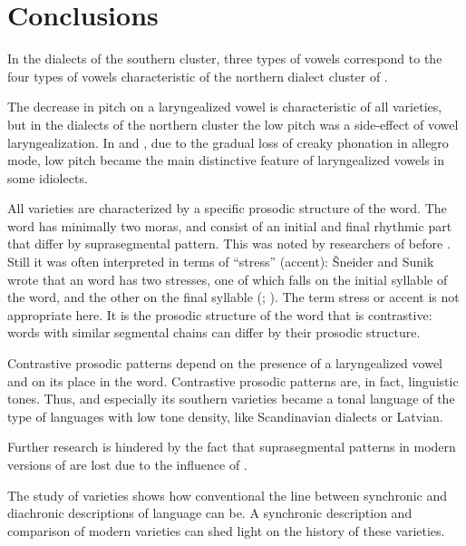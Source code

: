 \documentclass[output=paper,colorlinks,citecolor=brown]{langscibook}
\begin{document}
\section{Conclusions}

In the dialects of the southern cluster, three types of vowels correspond to the four types of vowels characteristic of the northern dialect cluster of .

The decrease in pitch on a laryngealized vowel is characteristic of all  varieties, but in the dialects of the northern cluster the low pitch was a side-effect of vowel laryngealization. In  and , due to the gradual loss of creaky phonation in allegro mode, low pitch became the main distinctive feature of laryngealized vowels in some idiolects.

\begin{sloppypar}
All  varieties are characterized by a specific prosodic structure of the word. The word has minimally two moras, and consist of an initial and final rhythmic part that differ by suprasegmental pattern. This was noted by researchers of  before \citep{Simonov1988}. Still it was often interpreted in terms of “stress” (accent): Šneider and Sunik wrote that an  word has two stresses, one of which falls on the initial syllable of the word, and the other on the final syllable (\citealt{Shneider1936}; \citealt{Sunik1968}). The term stress or accent is not appropriate here. It is the prosodic structure of the word that is contrastive: words with similar segmental chains can differ by their prosodic structure.
\end{sloppypar}

Contrastive prosodic patterns depend on the presence of a laryngealized vowel and on its place in the word. Contrastive prosodic patterns are, in fact, linguistic tones. Thus,  and especially its southern varieties became a tonal language of the type of languages with low tone density, like Scandinavian dialects or Latvian.

Further research is hindered by the fact that suprasegmental patterns in modern versions of  are lost due to the influence of .

The study of  varieties shows how conventional the line between synchronic and diachronic descriptions of language can be. A synchronic description and comparison of modern varieties can shed light on the history of these varieties.
\end{document}
